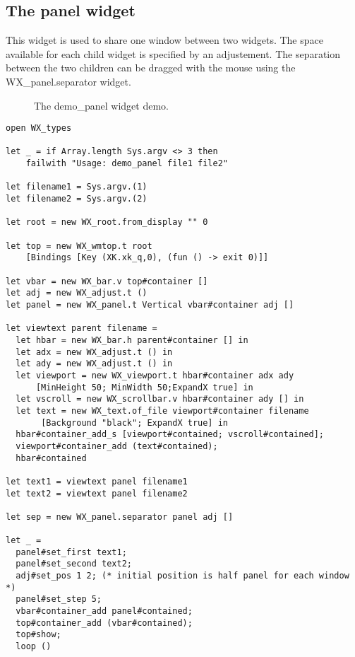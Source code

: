 \documentclass{report}
\newcommand{\psfigure}[3]{ %
  \begin{quote}\let\normalsize\small\caption{#3\label{fig:#2}}\end{quote}
  }
\begin{document}
\subsection{The {\sf panel} widget}

 This widget is used to share one window between two widgets. The space 
available for each child widget is specified by an adjustement. 
The separation between the two children can be dragged with the mouse 
using the {\sf WX\_panel.separator} widget.

\begin{figure}[t]
\begin{center}
\psfigure{1}{panel}{The demo\_panel widget demo.}
\end{center}
\end{figure}


\begin{verbatim}
open WX_types

let _ = if Array.length Sys.argv <> 3 then 
    failwith "Usage: demo_panel file1 file2"
    
let filename1 = Sys.argv.(1)
let filename2 = Sys.argv.(2)

let root = new WX_root.from_display "" 0

let top = new WX_wmtop.t root  
    [Bindings [Key (XK.xk_q,0), (fun () -> exit 0)]]

let vbar = new WX_bar.v top#container []
let adj = new WX_adjust.t ()
let panel = new WX_panel.t Vertical vbar#container adj []
  
let viewtext parent filename =
  let hbar = new WX_bar.h parent#container [] in
  let adx = new WX_adjust.t () in
  let ady = new WX_adjust.t () in
  let viewport = new WX_viewport.t hbar#container adx ady 
      [MinHeight 50; MinWidth 50;ExpandX true] in
  let vscroll = new WX_scrollbar.v hbar#container ady [] in
  let text = new WX_text.of_file viewport#container filename 
       [Background "black"; ExpandX true] in
  hbar#container_add_s [viewport#contained; vscroll#contained];  
  viewport#container_add (text#contained);  
  hbar#contained

let text1 = viewtext panel filename1
let text2 = viewtext panel filename2

let sep = new WX_panel.separator panel adj []
  
let _ =
  panel#set_first text1;
  panel#set_second text2;
  adj#set_pos 1 2; (* initial position is half panel for each window *)
  panel#set_step 5;
  vbar#container_add panel#contained;
  top#container_add (vbar#contained);  
  top#show;
  loop ()
\end{verbatim}
\end{document}
